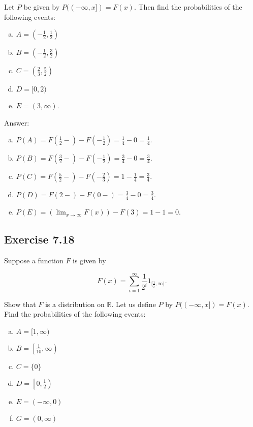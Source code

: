 \documentclass{article}
\begin{document}
Let $P$ be given by $P((-\infty, x]) = F(x)$. Then find the probabilities of the following events:

\begin{enumerate}[a)]
\item $A = \left(-\frac{1}{2}, \frac{1}{2}\right)$

\item $B = \left(-\frac{1}{2}, \frac{3}{2}\right)$

\item $C = \left(\frac{2}{3}, \frac{5}{2}\right)$

\item $D = [0,2)$

\item $E = (3,\infty)$. 
\end{enumerate}

Answer:

\begin{enumerate}[a)]
\item $P(A) = F\left(\frac{1}{2}-\right) - F\left(-\frac{1}{2}\right) = \frac{1}{4} - 0 = \frac{1}{4}$.

\item $P(B) = F\left(\frac{3}{2}-\right)-F\left(-\frac{1}{2}\right) =\frac{3}{4} - 0 = \frac{3}{4}$.

\item $P(C) = F\left(\frac{5}{2}-\right)-F\left(-\frac{2}{3}\right) = 1- \frac{1}{4} = \frac{3}{4}$.

\item $P(D) = F(2-) - F(0-) = \frac{3}{4} - 0 = \frac{3}{4}$.

\item $P(E) = (\lim_{x\rightarrow\infty} F(x)) - F(3) = 1 - 1 = 0$. 
\end{enumerate}

\subsection*{Exercise 7.18}

Suppose a function $F$ is given by

$$
F(x) = \sum_{i=1}^\infty \frac{1}{2^i}1_{[\frac{1}{i}, \infty)} .
$$

Show that $F$ is a distribution on $\mathbb{R}$. Let us define $P$ by $P((-\infty, x]) = F(x)$. Find the probabilities of the following events:

\begin{enumerate}[a)]
\item $A = [1,\infty)$

\item $B = \left[\frac{1}{10}, \infty\right)$

\item $C = \{0\}$

\item $D = \left[0, \frac{1}{2}\right)$ 

\item $E = (-\infty , 0)$

\item $G = (0,\infty)$
\end{enumerate}
\end{document}
